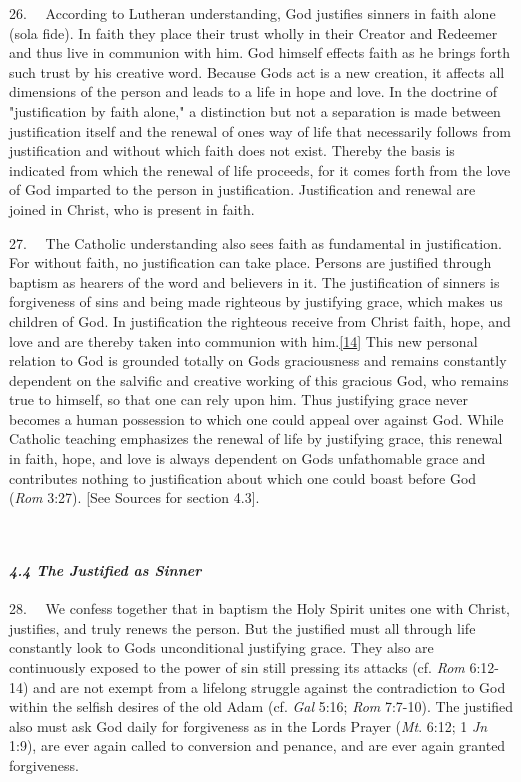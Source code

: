 26.~ ~According to Lutheran understanding, God justifies sinners in
faith alone (sola fide). In faith they place their trust wholly in their
Creator and Redeemer and thus live in communion with him. God himself
effects faith as he brings forth such trust by his creative word.
Because God\textquotesingle s act is a new creation, it affects all
dimensions of the person and leads to a life in hope and love. In the
doctrine of "justification by faith alone," a distinction but not a
separation is made between justification itself and the renewal of
one\textquotesingle s way of life that necessarily follows from
justification and without which faith does not exist. Thereby the basis
is indicated from which the renewal of life proceeds, for it comes forth
from the love of God imparted to the person in justification.
Justification and renewal are joined in Christ, who is present in faith.

27.~ ~The Catholic understanding also sees faith as fundamental in
justification. For without faith, no justification can take place.
Persons are justified through baptism as hearers of the word and
believers in it. The justification of sinners is forgiveness of sins and
being made righteous by justifying grace, which makes us children of
God. In justification the righteous receive from Christ faith, hope, and
love and are thereby taken into communion with
him.\label{r14}{}\hyperref[14]{{[}14{]}} This new
personal relation to God is grounded totally on God\textquotesingle s
graciousness and remains constantly dependent on the salvific and
creative working of this gracious God, who remains true to himself, so
that one can rely upon him. Thus justifying grace never becomes a human
possession to which one could appeal over against God. While Catholic
teaching emphasizes the renewal of life by justifying grace, this
renewal in faith, hope, and love is always dependent on
God\textquotesingle s unfathomable grace and contributes nothing to
justification about which one could boast before God (\emph{Rom} 3:27).
{[}See Sources for section 4.3{]}.

~

\paragraph{\texorpdfstring{\emph{4.4 The Justified as
Sinner}}{4.4 The Justified as Sinner}}\label{the-justified-as-sinner}

28.~ ~We confess together that in baptism the Holy Spirit unites one
with Christ, justifies, and truly renews the person. But the justified
must all through life constantly look to God\textquotesingle s
unconditional justifying grace. They also are continuously exposed to
the power of sin still pressing its attacks (cf. \emph{Rom} 6:12-14) and
are not exempt from a lifelong struggle against the contradiction to God
within the selfish desires of the old Adam (cf. \emph{Gal} 5:16;
\emph{Rom} 7:7-10). The justified also must ask God daily for
forgiveness as in the Lord\textquotesingle s Prayer (\emph{Mt}. 6:12; 1
\emph{Jn} 1:9), are ever again called to conversion and penance, and are
ever again granted forgiveness.

